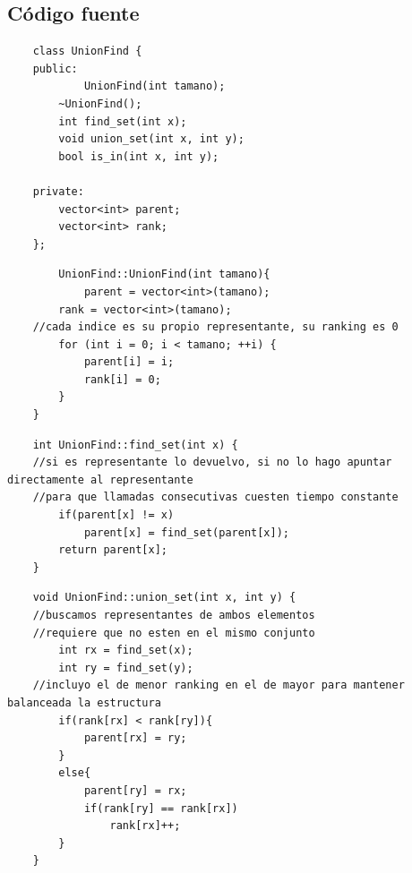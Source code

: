 \newpage
\subsection{C\'odigo fuente}

	\begin{codesnippet}
	\begin{verbatim}
    class UnionFind {
    public:
        	UnionFind(int tamano);
        ~UnionFind();
        int find_set(int x);
        void union_set(int x, int y);
        bool is_in(int x, int y);

    private:
        vector<int> parent;
        vector<int> rank;
    };
	\end{verbatim}
	\end{codesnippet}

	\begin{codesnippet}
	\begin{verbatim}
    	UnionFind::UnionFind(int tamano){
        	parent = vector<int>(tamano);
        rank = vector<int>(tamano);
    //cada indice es su propio representante, su ranking es 0
        for (int i = 0; i < tamano; ++i) {
            parent[i] = i;
            rank[i] = 0;
        }
    }
	\end{verbatim}
	\end{codesnippet}

	\begin{codesnippet}
	\begin{verbatim}
    int UnionFind::find_set(int x) {
    //si es representante lo devuelvo, si no lo hago apuntar directamente al representante
    //para que llamadas consecutivas cuesten tiempo constante
        if(parent[x] != x)
            parent[x] = find_set(parent[x]);
        return parent[x];
    }
	\end{verbatim}
	\end{codesnippet}

	\begin{codesnippet}
	\begin{verbatim}
    void UnionFind::union_set(int x, int y) {
    //buscamos representantes de ambos elementos
    //requiere que no esten en el mismo conjunto
        int rx = find_set(x);
        int ry = find_set(y);
    //incluyo el de menor ranking en el de mayor para mantener balanceada la estructura
        if(rank[rx] < rank[ry]){
            parent[rx] = ry;
        }
        else{
            parent[ry] = rx;
            if(rank[ry] == rank[rx])
                rank[rx]++;
        }
    }
	\end{verbatim}
	\end{codesnippet}

